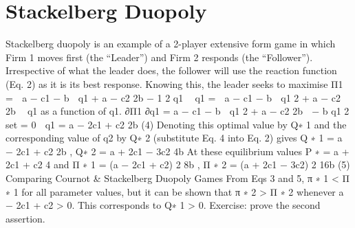 \newpage

\section{Stackelberg Duopoly}
Stackelberg duopoly is an example of a 2-player extensive form game in which Firm 1
moves first (the “Leader”) and Firm 2 responds (the “Follower”). Irrespective of what
the leader does, the follower will use the reaction function (Eq. 2) as it is its best response.
Knowing this, the leader seeks to maximise
Π1 =

a − c1 − b

q1 +
a − c2
2b
−
1
2
q1
 q1 =

a − c1 − b

q1
2
+
a − c2
2b
 q1
as a function of q1.
∂Π1
∂q1
= a − c1 − b

q1
2
+
a − c2
2b

− b
q1
2
set = 0
⇒ q1 =
a − 2c1 + c2
2b
(4)
Denoting this optimal value by Q∗
1
and the corresponding value of q2 by Q∗
2
(substitute
Eq. 4 into Eq. 2) gives
Q
∗
1 =
a − 2c1 + c2
2b
, Q∗
2 =
a + 2c1 − 3c2
4b
At these equilibrium values
P
∗ =
a + 2c1 + c2
4
and
Π
∗
1 =
(a − 2c1 + c2)
2
8b
, Π
∗
2 =
(a + 2c1 − 3c2)
2
16b
(5)
Comparing Cournot & Stackelberg Duopoly Games
From Eqs 3 and 5,
π
∗
1 < Π
∗
1
for all parameter values, but it can be shown that
π
∗
2 > Π
∗
2
whenever a − 2c1 + c2 > 0. This corresponds to Q∗
1 > 0.
Exercise: prove the second assertion.
